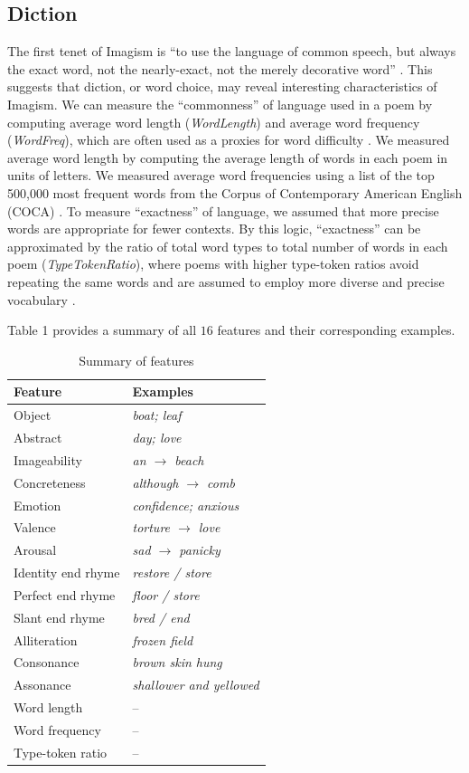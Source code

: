 \documentclass{book}
\begin{document}
\subsection{Diction}
The first tenet of Imagism is ``to use the language of common speech, but always the exact word, not the nearly-exact, not the merely decorative word'' \citep{aldington1916some}. This suggests that diction, or word choice, may reveal interesting characteristics of Imagism. We can measure the ``commonness'' of language used in a poem by computing average word length (\emph{WordLength}) and average word frequency (\emph{WordFreq}), which are often used as a proxies for word difficulty \citep{frequencyDifficulty}. We measured average word length by computing the average length of words in each poem in units of letters. We measured average word frequencies using a list of the top 500,000 most frequent words from the Corpus of Contemporary American English (COCA) \citep{COCA}. To measure ``exactness'' of language, we assumed that more precise words are appropriate for fewer contexts. By this logic, ``exactness'' can be approximated by the ratio of total word types to total number of words in each poem (\emph{TypeTokenRatio}), where poems with higher type-token ratios avoid repeating the same words and are assumed to employ more diverse and precise vocabulary \citep{automaticEssay, readability}. 

Table 1 provides a summary of all $16$ features and their corresponding examples.
\begin{table}
\center
\begin{tabular}{l l }
\textbf{Feature} & \textbf{Examples} \\\hline
Object & \emph{boat; leaf} \\
Abstract & \emph{day; love} \\
Imageability & \emph{an $\rightarrow$ beach} \\
Concreteness & \emph{although $\rightarrow$ comb}\\\hline
Emotion &  \emph{confidence; anxious} \\
Valence & \emph{torture $\rightarrow$ love}\\
Arousal & \emph{sad $\rightarrow$ panicky}\\\hline
Identity end rhyme & \emph{restore / store} \\
Perfect end rhyme & \emph{floor / store} \\
Slant end rhyme & \emph{bred / end}\\
Alliteration & \emph{frozen field}\\
Consonance & \emph{brown skin hung}\\
Assonance & \emph{shallower and yellowed}\\\hline
Word length &  --\\
Word frequency &  --\\
Type-token ratio & --\\\hline
\end{tabular}
 \caption{Summary of features}
\end{table}
\end{document}
